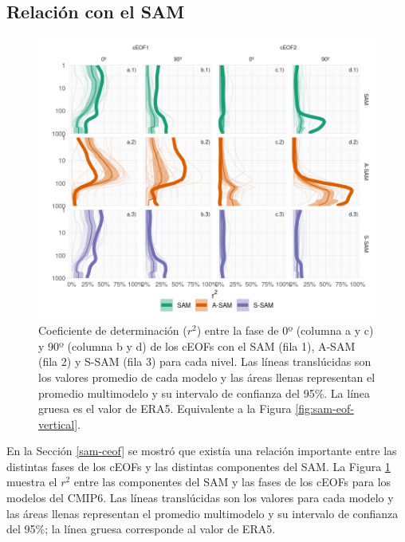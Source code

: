 \documentclass[12pt,oneside,a4paper]{reedthesis}
\begin{document}
\hypertarget{relaciuxf3n-con-el-sam}{%
\subsection{Relación con el SAM}\label{relaciuxf3n-con-el-sam}}

\begin{figure}

{\centering \includegraphics{figures/50-cmip6/cor-sam-cmip6-1} 

}

\caption{Coeficiente de determinación (\(r^2\)) entre la fase de 0º (columna a y c) y 90º (columna b y d) de los cEOFs con el SAM (fila 1), A-SAM (fila 2) y S-SAM (fila 3) para cada nivel. Las líneas translúcidas son los valores promedio de cada modelo y las áreas llenas representan el promedio multimodelo y su intervalo de confianza del 95\%. La línea gruesa es el valor de ERA5. Equivalente a la Figura \ref{fig:sam-eof-vertical}.}\label{fig:cor-sam-cmip6}
\end{figure}



En la Sección \ref{sam-ceof} se mostró que existía una relación importante entre las distintas fases de los cEOFs y las distintas componentes del SAM.
La Figura \ref{fig:cor-sam-cmip6} muestra el \(r^2\) entre las componentes del SAM y las fases de los cEOFs para los modelos del CMIP6.
Las líneas translúcidas son los valores para cada modelo y las áreas llenas representan el promedio multimodelo y su intervalo de confianza del 95\%; la línea gruesa corresponde al valor de ERA5.
\end{document}
